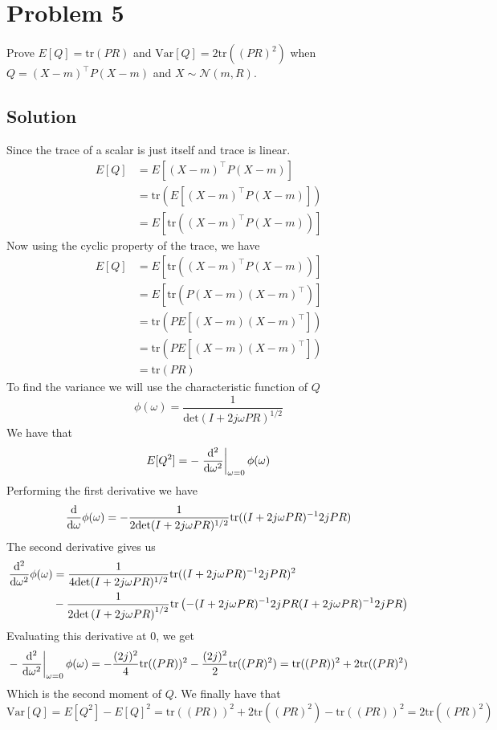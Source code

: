 \documentclass[a4paper]{article}
\begin{document}
\section*{Problem 5}%
Prove $E[Q] = \text{tr}(PR)$ and $\text{Var}[Q] = 2 \text{tr} ((PR)^2)$ when $Q = (X - m)^\top P (X-m)$ and $X \sim \mathcal{N}(m, R)$.

\subsection*{Solution}%
Since the trace of a scalar is just itself and trace is linear. 
\[
  \begin{aligned}
    E[Q] &= E \left[ (X-m)^\top P (X-m) \right] \\
         &= \text{tr} \left(E \left[ (X-m)^\top P (X-m) \right] \right) \\
         &= E \left[ \text{tr}\left((X-m)^\top P (X-m)\right)\right]
  \end{aligned}
\]
Now using the cyclic property of the trace, we have
\[
  \begin{aligned}
    E[Q] &= E \left[ \text{tr}\left((X-m)^\top P (X-m)\right)\right] \\
         &= E \left[ \text{tr}\left(P (X-m)(X-m)^\top\right)\right] \\
         &= \text{tr}\left(P E[(X-m)(X-m)^\top]\right) \\
         &= \text{tr}\left(P E[(X-m)(X-m)^\top]\right) \\
         &= \text{tr} \left( PR \right)
  \end{aligned}
\]
To find the variance we will use the characteristic function of $Q$
\[
  \phi(\omega) = \frac{1}{\text{det}\left( I + 2j\omega PR \right)^{1/2}}
\]
We have that
\[
  \begin{aligned}
  E[Q^2] = -\eval{\dv[2]{}{\omega}}_{\omega=0} \phi(\omega) \\
  \end{aligned}
\]
Performing the first derivative we have
\[
  \dv{}{\omega} \phi(\omega) = - \frac{1}{2\text{det}(I + 2j\omega PR)^{1/2}} \text{tr}( (I+2j\omega PR)^{-1} 2jPR)
\]
The second derivative gives us
\[
  \begin{aligned}
    \dv[2]{}{\omega} \phi(\omega) &=
  \frac{1}{4\text{det}(I + 2j\omega PR)^{1/2}} \text{tr}((I+2j\omega PR)^{-1} 2jPR)^2  \\
                                  &-\frac{1}{2\text{det}\left( I + 2j\omega PR \right)^{1/2}}\text{tr} \left(-(I+2j\omega PR)^{-1}2jPR(I + 2j\omega PR)^{-1} 2jPR \right)
  \end{aligned}
\]
Evaluating this derivative at 0, we get
\[
  - \eval{\dv[2]{}{\omega}}_{\omega = 0} \phi(\omega) =  -\frac{(2j)^2}{4} \text{tr}((PR))^2 - \frac{(2j)^2}{2} \text{tr}((PR)^2) = \text{tr}((PR))^2 + 2 \text{tr}((PR)^2)
\]
Which is the second moment of $Q$. We finally have that
\[
  \text{Var}[Q] =  E[Q^2] - E[Q]^2 =  \text{tr}((PR))^2 + 2 \text{tr}((PR)^2) - \text{tr}((PR))^2 = 2 \text{tr}((PR)^2)
\]
\end{document}
